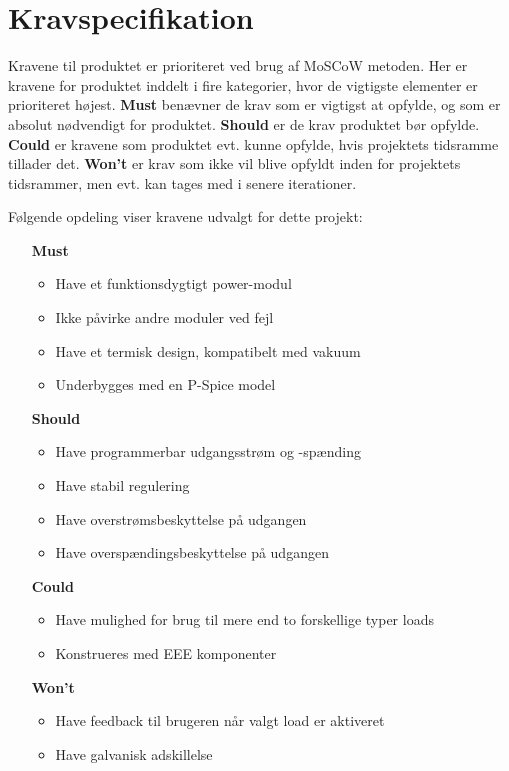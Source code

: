 \chapter{Kravspecifikation}

Kravene til produktet er prioriteret ved brug af MoSCoW metoden. Her er kravene for produktet inddelt i fire kategorier, hvor de vigtigste elementer er prioriteret højest. \textbf{Must} benævner de krav som er vigtigst at opfylde, og som er absolut nødvendigt for produktet. \textbf{Should} er de krav produktet bør opfylde. \textbf{Could} er kravene som produktet evt. kunne opfylde, hvis projektets tidsramme tillader det. \textbf{Won't} er krav som ikke vil blive opfyldt inden for projektets tidsrammer, men evt. kan tages med i senere iterationer.

\noindent Følgende opdeling viser kravene udvalgt for dette projekt:
\begin{itemize}
	\item[\textbf{Must}]
		\begin{itemize}
			\item Have et funktionsdygtigt power-modul
			\item Ikke påvirke andre moduler ved fejl
			\item Have et termisk design, kompatibelt med vakuum
			\item Underbygges med en P-Spice model

		\end{itemize}
	\item[\textbf{Should}]
		\begin{itemize}
			\item Have programmerbar udgangsstrøm og -spænding
			\item Have stabil regulering
			\item Have overstrømsbeskyttelse på udgangen
			\item Have overspændingsbeskyttelse på udgangen

		\end{itemize}
	\item[\textbf{Could}] 
		\begin{itemize}
			\item Have mulighed for brug til mere end to forskellige typer loads
			\item Konstrueres med EEE komponenter

		\end{itemize}
	\item[\textbf{Won't}]
		\begin{itemize}
			\item Have feedback til brugeren når valgt load er aktiveret
			\item Have galvanisk adskillelse
			
		\end{itemize}
\end{itemize}

